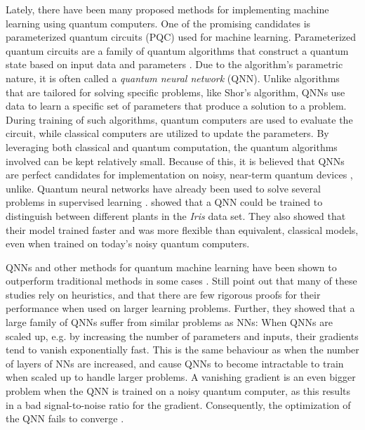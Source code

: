 Lately, there have been many proposed methods for implementing machine learning using quantum computers. One of the promising candidates is parameterized quantum circuits (PQC) used for machine learning. Parameterized quantum circuits are a family of quantum algorithms that construct a quantum state based on input data and parameters \cite{Benedetti_2019}. Due to the algorithm's parametric nature, it is often called a \emph{quantum neural network} (QNN). Unlike algorithms that are tailored for solving specific problems, like Shor's algorithm, QNNs use data to learn a specific set of parameters that produce a solution to a problem. During training of such algorithms, quantum computers are used to evaluate the circuit, while classical computers are utilized to update the parameters. By leveraging both classical and quantum computation, the quantum algorithms involved can be kept relatively small. Because of this, it is believed that QNNs are perfect candidates for implementation on noisy, near-term quantum devices \citet{Cerezo_2021}, unlike. Quantum neural networks have already been used to solve several problems in supervised learning \cite{Benedetti_2019, abbas2020power, lloyd2018quantum}. \citet{abbas2020power} showed that a QNN could be trained to distinguish between different plants in the \emph{Iris} data set. They also showed that their model trained faster and was more flexible than equivalent, classical models, even when trained on today's noisy quantum computers.

QNNs and other methods for quantum machine learning have been shown to outperform traditional methods in some cases \cite{abbas2020power}. Still \citet{McClean_2018} point out that many of these studies rely on heuristics, and that there are few rigorous proofs for their performance when used on larger learning problems. Further, they showed that a large family of QNNs suffer from similar problems as NNs: When QNNs are scaled up, e.g. by increasing the number of parameters and inputs, their gradients tend to vanish exponentially fast. This is the same behaviour as when the number of layers of NNs are increased, and cause QNNs to become intractable to train when scaled up to handle larger problems. A vanishing gradient is an even bigger problem when the QNN is trained on a noisy quantum computer, as this results in a bad signal-to-noise ratio for the gradient. Consequently, the optimization of the QNN fails to converge \cite{skolik2020layerwise}.

